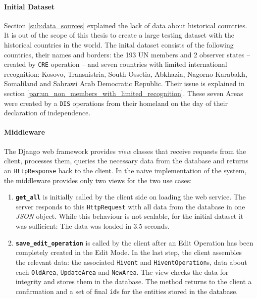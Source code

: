 \paragraph{Initial Dataset} %
\label{par:initial_dataset}

Section \ref{sub:data_sources} explained the lack of data about historical countries. It is out of the scope of this thesis to create a large testing dataset with the historical countries in the world. The inital dataset consists of the following countries, their names and borders: the 193 UN members and 2 observer states -- created by \texttt{CRE} operation -- and seven countries with limited international recognition: Kosovo, Transnistria, South Ossetia, Abkhazia, Nagorno-Karabakh, Somaliland and Sahrawi Arab Democratic Republic. Their issue is explained in section \ref{par:un_non_members_with_limited_recognition}. These seven Areas were created by a \texttt{DIS} operations from their homeland on the day of their declaration of independence.


\paragraph{Middleware} %
\label{par:middleware}

The Django web framework provides \emph{view} classes that receive requests from the client, processes them, queries the necessary data from the database and returns an \texttt{HttpResponse} back to the client. In the naive implementation of the system, the middleware provides only two views for the two use cases:

\begin{enumerate}
  \item \textbf{\texttt{get\_all}} is initially called by the client side on loading the web service. The server responds to this \texttt{HttpRequest} with all data from the database in one \emph{JSON} object. While this behaviour is not scalable, for the initial dataset it was sufficient: The data was loaded in 3.5 seconds.
  \item \textbf{\texttt{save\_edit\_operation}} is called by the client after an Edit Operation has been completely created in the Edit Mode. In the last step, the client assembles the relevant data: the associated \texttt{Hivent} and \texttt{HiventOperation}s, data about each \texttt{OldArea}, \texttt{UpdateArea} and \texttt{NewArea}. The view checks the data for integrity and stores them in the database. The method returns to the client a confirmation and a set of final \texttt{id}s for the entities stored in the database.
\end{enumerate}

